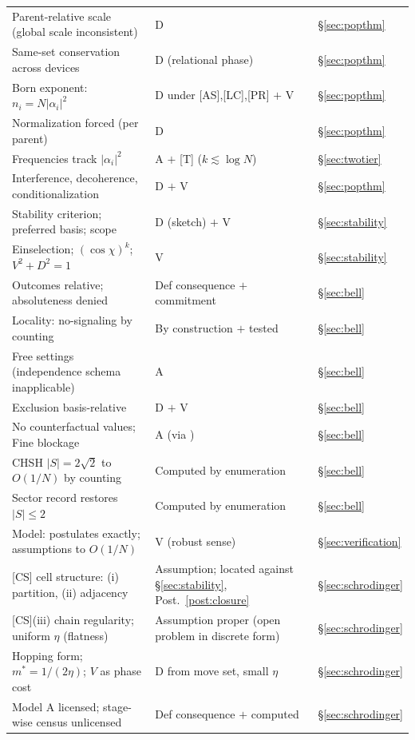 \documentclass[11pt]{article}
\theoremstyle{definition}
\theoremstyle{remark}
\begin{document}
{\begin{longtable}{@{}lll@{}}
Parent-relative scale (global scale inconsistent) & D \cite{TillittBorn} & \S\ref{sec:popthm}\\
Same-set conservation across devices & D (relational phase) & \S\ref{sec:popthm}\\
Born exponent: $n_i = N|\alpha_i|^2$ & D under [AS],[LC],[PR] $+$ V & \S\ref{sec:popthm}\\
Normalization forced (per parent) & D & \S\ref{sec:popthm}\\
Frequencies track $|\alpha_i|^2$ & A $+$ [T] ($k \lesssim \log N$) & \S\ref{sec:twotier}\\
Interference, decoherence, conditionalization & D $+$ V & \S\ref{sec:popthm}\\
Stability criterion; preferred basis; scope & D (sketch) $+$ V & \S\ref{sec:stability}\\
Einselection; $(\cos\chi)^k$; $V^2{+}D^2{=}1$ & V & \S\ref{sec:stability}\\
Outcomes relative; absoluteness denied & Def consequence $+$ commitment & \S\ref{sec:bell}\\
Locality: no-signaling by counting & By construction $+$ tested & \S\ref{sec:bell}\\
Free settings (independence schema inapplicable) & A & \S\ref{sec:bell}\\
Exclusion basis-relative & D $+$ V \cite{TillittCHSH} & \S\ref{sec:bell}\\
No counterfactual values; Fine blockage & A (via \cite{Fine1982}) & \S\ref{sec:bell}\\
CHSH $|S| = 2\sqrt2$ to $O(1/N)$ by counting & Computed by enumeration \cite{TillittCHSH} & \S\ref{sec:bell}\\
Sector record restores $|S| \le 2$ & Computed by enumeration \cite{TillittCHSH} & \S\ref{sec:bell}\\
Model: postulates exactly; assumptions to $O(1/N)$ & V (robust sense) & \S\ref{sec:verification}\\
{[CS]} cell structure: (i) partition, (ii) adjacency & Assumption; located against \S\ref{sec:stability}, Post.~\ref{post:closure} & \S\ref{sec:schrodinger}\\
{[CS]}(iii) chain regularity; uniform $\eta$ (flatness) & Assumption proper (open problem in discrete form) & \S\ref{sec:schrodinger}\\
Hopping form; $m^\ast = 1/(2\eta)$; $V$ as phase cost & D from move set, small $\eta$ \cite{TillittSchr} & \S\ref{sec:schrodinger}\\
Model A licensed; stage-wise census unlicensed & Def consequence $+$ computed & \S\ref{sec:schrodinger}\\

\end{longtable}}
\end{document}
